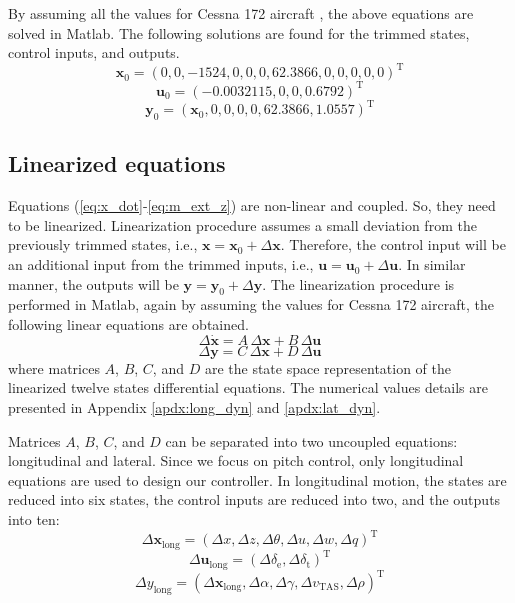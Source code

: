 \documentclass[lettersize,journal]{IEEEtran}
\begin{document}
By assuming all the values for Cessna 172 aircraft \cite{ref12}, the above equations are solved in Matlab. The following solutions are found for the trimmed states, control inputs, and outputs.
\begin{equation}\label{eq:trim_states_vals}
\bm{x_{\mathrm{0}}}=(0, 0, -1524, 0, 0, 0, 62.3866, 0, 0, 0, 0, 0)^{\mathrm{T}}
\end{equation}
\begin{equation}\label{eq:trim_input_vals}
\bm{u_{\mathrm{0}}}=(-0.0032115, 0, 0, 0.6792)^{\mathrm{T}}
\end{equation}
\begin{equation}\label{eq:trim_output_vals}
\bm{y_{\mathrm{0}}}=(\bm{x_{\mathrm{0}}}, 0, 0, 0, 0, 62.3866, 1.0557)^{\mathrm{T}}
\end{equation}

\subsection{Linearized equations}
Equations (\ref{eq:x_dot}-\ref{eq:m_ext_z}) are non-linear and coupled. So, they need to be linearized. Linearization procedure assumes a small deviation from the previously trimmed states, i.e., $\bm{x}=\bm{x}_0+\Delta \bm{x}$. Therefore, the control input will be an additional input from the trimmed inputs, i.e., $\bm{u}=\bm{u}_0+\Delta \bm{u}$. In similar manner, the outputs will be $\bm{y}=\bm{y}_0+\Delta \bm{y}$. The linearization procedure is performed in Matlab, again by assuming the values for Cessna 172 aircraft, the following linear equations are obtained.
\begin{equation}
\Delta \bm{\dot{x}} = A\,\Delta\bm{x} + B\,\Delta\bm{u}
\end{equation}
\begin{equation}
\Delta\bm{y} = C\,\Delta\bm{x} + D\,\Delta\bm{u}
\end{equation}
where matrices $A$, $B$, $C$, and $D$ are the state space representation of the linearized twelve states differential equations. The numerical values details are presented in Appendix \ref{apdx:long_dyn} and \ref{apdx:lat_dyn}.

Matrices $A$, $B$, $C$, and $D$ can be separated into two uncoupled equations: longitudinal and lateral. Since we focus on pitch control, only longitudinal equations are used to design our controller. In longitudinal motion, the states are reduced into six states, the control inputs are reduced into two, and the outputs into ten:
\begin{equation}\label{eq:long_states}
\Delta \bm{x}_{\mathrm{long}} = (\Delta x, \Delta z, \Delta \theta, \Delta u, \Delta w, \Delta q)^{\mathrm{T}}
\end{equation}
\begin{equation}
\Delta \bm{u}_{\mathrm{long}} = (\Delta \delta _{\mathrm{e}}, \Delta \delta _{\mathrm{t}})^{\mathrm{T}}
\end{equation}
\begin{equation}
\Delta y_{\mathrm{long}} = (\Delta \bm{x}_{\mathrm{long}}, \Delta \alpha, \Delta \gamma, \Delta v_{\mathrm{TAS}}, \Delta \rho)^{\mathrm{T}}
\end{equation}
\end{document}
